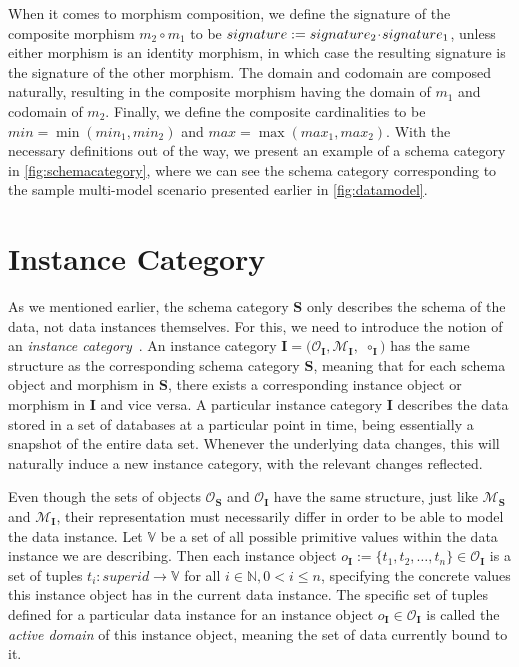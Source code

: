 When it comes to morphism composition, we define the signature of the composite morphism $m_2 \circ m_1$ to be $signature := signature_2\!\cdot\! signature_1$, unless either morphism is an identity morphism, in which case the resulting signature is the signature of the other morphism.
The domain and codomain are composed naturally, resulting in the composite morphism having the domain of $m_1$ and codomain of $m_2$.
Finally, we define the composite cardinalities to be  $min = \min(min_1, min_2)$ and $max = \max(max_1, max_2)$.
With the necessary definitions out of the way, we present an example of a schema category in \cref{fig:schemacategory}, where we can see the schema category corresponding to the sample multi-model scenario presented earlier in \cref{fig:datamodel}.

\section{Instance Category}
\label{categorical:section:instance}

As we mentioned earlier, the schema category $\mathbf{S}$ only describes the schema of the data, not data instances themselves.
For this, we need to introduce the notion of an \textit{instance category}~\cite{one_model}\cite{unified_representation}.
An instance category $\mathbf{I} = (\mathcal{O}_\mathbf{I}, \mathcal{M}_\mathbf{I},$ $\circ_\mathbf{I})$ has the same structure as the corresponding schema category $\mathbf{S}$, meaning that for each schema object and morphism in $\mathbf{S}$, there exists a corresponding instance object or morphism in $\mathbf{I}$ and vice versa.
A particular instance category $\mathbf{I}$ describes the data stored in a set of databases at a particular point in time, being essentially a snapshot of the entire data set.
Whenever the underlying data changes, this will naturally induce a new instance category, with the relevant changes reflected.

Even though the sets of objects $\mathcal{O}_\mathbf{S}$ and $\mathcal{O}_\mathbf{I}$ have the same structure, just like $\mathcal{M}_\mathbf{S}$ and $\mathcal{M}_\mathbf{I}$, their representation must necessarily differ in order to be able to model the data instance.
Let $\mathbb{V}$ be a set of all possible primitive values within the data instance we are describing.
Then each instance object $o_\mathbf{I} := \{t_1, t_2, \dots, t_n\} \in \mathcal{O}_\mathbf{I}$ is a set of tuples $t_i: superid \rightarrow \mathbb{V}$ for all $i \in \mathbb{N}, 0 < i \leq n$, specifying the concrete values this instance object has in the current data instance.
The specific set of tuples defined for a particular data instance for an instance object $o_\mathbf{I} \in \mathcal{O}_\mathbf{I}$ is called the \textit{active domain} of this instance object, meaning the set of data currently bound to it.

